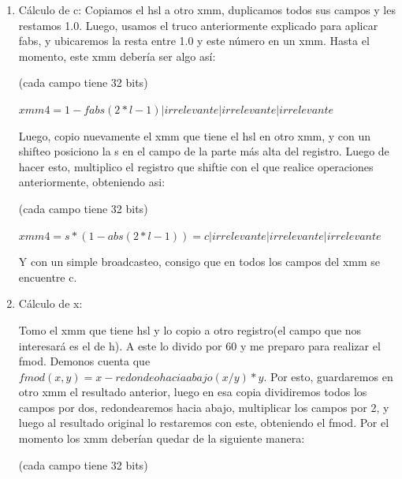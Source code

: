 \documentclass[a4paper]{article}
\begin{document}
\begin{enumerate}
	\item Cálculo de c:
	Copiamos el hsl a otro xmm, duplicamos todos sus campos y les restamos 1.0. Luego, usamos el truco anteriormente explicado para aplicar fabs, y ubicaremos la resta entre 1.0 y este número en un xmm. Hasta el momento, este xmm debería ser algo así:
	
\vspace*{0.3cm}

(cada campo tiene 32 bits)	
	
\vspace*{0.3cm}	
	
	$xmm4 = 1-fabs(2*l - 1)|irrelevante|irrelevante|irrelevante$
		
\vspace*{0.3cm}

Luego, copio nuevamente el xmm que tiene el hsl en otro xmm, y con un shifteo posiciono la s en el campo de la parte más alta del registro. Luego de hacer esto, multiplico el registro que shiftie con el que realice operaciones anteriormente, obteniendo asi:

\vspace*{0.3cm}

(cada campo tiene 32 bits)	
	
\vspace*{0.3cm}	
	
	$xmm4 = s*(1-abs(2*l - 1))=c|irrelevante|irrelevante|irrelevante$
		
\vspace*{0.3cm}
		
	Y con un simple broadcasteo, consigo que en todos los campos del xmm se encuentre c.
	
	\item Cálculo de x:		
		
Tomo el xmm que tiene hsl y lo copio a otro registro(el campo que nos interesará es el de h). A este lo divido por 60 y me preparo para realizar el fmod. Demonos cuenta que $fmod(x,y) = x-redondeohaciaabajo(x/y) * y$. Por esto, guardaremos en otro xmm el resultado anterior, luego en esa copia dividiremos todos los campos por dos, redondearemos hacia abajo, multiplicar los campos por 2, y luego al resultado original lo restaremos con este, obteniendo el fmod. Por el momento los xmm deberían quedar de la siguiente manera:

\vspace*{0.3cm}

(cada campo tiene 32 bits)	
	

\end{enumerate}
\end{document}
